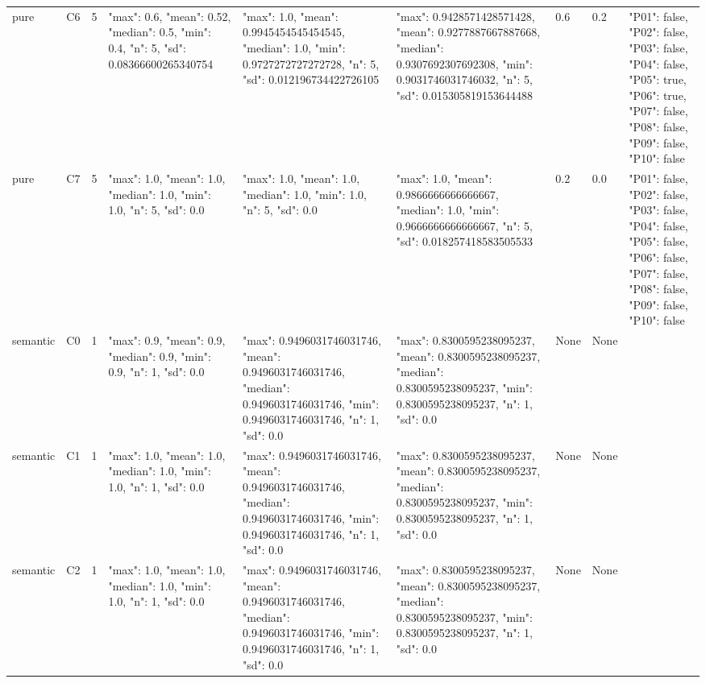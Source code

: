 \begin{tabular}{lllllllll}
pure & C6 & 5 & {"max": 0.6, "mean": 0.52, "median": 0.5, "min": 0.4, "n": 5, "sd": 0.08366600265340754} & {"max": 1.0, "mean": 0.9945454545454545, "median": 1.0, "min": 0.9727272727272728, "n": 5, "sd": 0.012196734422726105} & {"max": 0.9428571428571428, "mean": 0.9277887667887668, "median": 0.9307692307692308, "min": 0.9031746031746032, "n": 5, "sd": 0.015305819153644488} & 0.6 & 0.2 & {"P01": false, "P02": false, "P03": false, "P04": false, "P05": true, "P06": true, "P07": false, "P08": false, "P09": false, "P10": false} \\
pure & C7 & 5 & {"max": 1.0, "mean": 1.0, "median": 1.0, "min": 1.0, "n": 5, "sd": 0.0} & {"max": 1.0, "mean": 1.0, "median": 1.0, "min": 1.0, "n": 5, "sd": 0.0} & {"max": 1.0, "mean": 0.9866666666666667, "median": 1.0, "min": 0.9666666666666667, "n": 5, "sd": 0.018257418583505533} & 0.2 & 0.0 & {"P01": false, "P02": false, "P03": false, "P04": false, "P05": false, "P06": false, "P07": false, "P08": false, "P09": false, "P10": false} \\
semantic & C0 & 1 & {"max": 0.9, "mean": 0.9, "median": 0.9, "min": 0.9, "n": 1, "sd": 0.0} & {"max": 0.9496031746031746, "mean": 0.9496031746031746, "median": 0.9496031746031746, "min": 0.9496031746031746, "n": 1, "sd": 0.0} & {"max": 0.8300595238095237, "mean": 0.8300595238095237, "median": 0.8300595238095237, "min": 0.8300595238095237, "n": 1, "sd": 0.0} & None & None & {} \\
semantic & C1 & 1 & {"max": 1.0, "mean": 1.0, "median": 1.0, "min": 1.0, "n": 1, "sd": 0.0} & {"max": 0.9496031746031746, "mean": 0.9496031746031746, "median": 0.9496031746031746, "min": 0.9496031746031746, "n": 1, "sd": 0.0} & {"max": 0.8300595238095237, "mean": 0.8300595238095237, "median": 0.8300595238095237, "min": 0.8300595238095237, "n": 1, "sd": 0.0} & None & None & {} \\
semantic & C2 & 1 & {"max": 1.0, "mean": 1.0, "median": 1.0, "min": 1.0, "n": 1, "sd": 0.0} & {"max": 0.9496031746031746, "mean": 0.9496031746031746, "median": 0.9496031746031746, "min": 0.9496031746031746, "n": 1, "sd": 0.0} & {"max": 0.8300595238095237, "mean": 0.8300595238095237, "median": 0.8300595238095237, "min": 0.8300595238095237, "n": 1, "sd": 0.0} & None & None & {} \\

\end{tabular}

